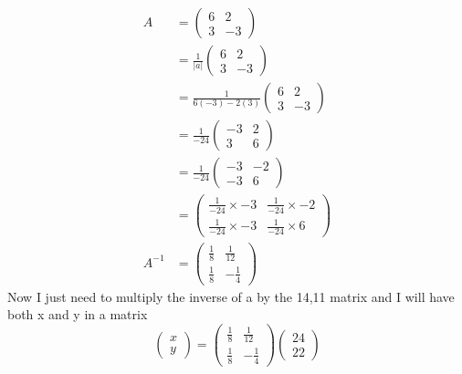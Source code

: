 \documentclass{article}
\begin{document}
\begin{align*}
	A  &=
	\begin{pmatrix}
		6 & 2\\
		3 & -3
	\end{pmatrix}
	\\
	&= \frac{1}{|a|}
	\begin{pmatrix}
		6 & 2\\
		3 & -3
	\end{pmatrix}
	\\
	&= \frac{1}{6(-3) - 2(3)}
	\begin{pmatrix}
		6 & 2\\
		3 & -3
	\end{pmatrix}
	\\
	&= \frac{1}{-24}
	\begin{pmatrix}
		-3 & 2\\
		3 & 6
	\end{pmatrix}
	\\
	&= \frac{1}{-24}
	\begin{pmatrix}
		-3 & -2\\
		-3 & 6
	\end{pmatrix}
	\\
	&=
	\begin{pmatrix}
		\frac{1}{-24}\times-3 & \frac{1}{-24}\times-2\\
		\frac{1}{-24}\times-3 & \frac{1}{-24}\times6
	\end{pmatrix}
	\\
	A^{-1}&=
	\begin{pmatrix}
		\frac{1}{8} & \frac{1}{12}\\
		\frac{1}{8} & -\frac{1}{4}
	\end{pmatrix}
\end{align*}
Now I just need to multiply the inverse of a by the 14,11 matrix and I will have both x and y in a matrix
\[
	\begin{pmatrix}
		x\\
		y
	\end{pmatrix}
	=
	\begin{pmatrix}
		\frac{1}{8} & \frac{1}{12}\\
		\frac{1}{8} & -\frac{1}{4}
	\end{pmatrix}
	\begin{pmatrix}
		24\\
		22
	\end{pmatrix}
\]
\end{document}
